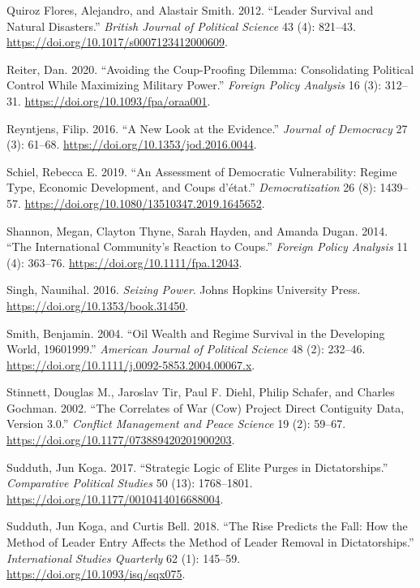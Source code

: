 \documentclass[
  12pt,
]{report}
\newlength{\cslhangindent}
\newenvironment{CSLReferences}[2] %
 {\begin{list}{}{%
  \setlength{\itemindent}{0pt}
  \setlength{\leftmargin}{0pt}
  \setlength{\parsep}{0pt}
  \ifodd #1
   \setlength{\leftmargin}{\cslhangindent}
   \setlength{\itemindent}{-1\cslhangindent}
  \fi
  \setlength{\itemsep}{#2\baselineskip}}}
 {\end{list}}
\begin{document}
\begin{CSLReferences}{1}{0}
Quiroz Flores, Alejandro, and Alastair Smith. 2012. {``Leader Survival
and Natural Disasters.''} \emph{British Journal of Political Science} 43
(4): 821--43. \url{https://doi.org/10.1017/s0007123412000609}.

Reiter, Dan. 2020. {``Avoiding the Coup-Proofing Dilemma: Consolidating
Political Control While Maximizing Military Power.''} \emph{Foreign
Policy Analysis} 16 (3): 312--31.
\url{https://doi.org/10.1093/fpa/oraa001}.

Reyntjens, Filip. 2016. {``A New Look at the Evidence.''} \emph{Journal
of Democracy} 27 (3): 61--68.
\url{https://doi.org/10.1353/jod.2016.0044}.

Schiel, Rebecca E. 2019. {``An Assessment of Democratic Vulnerability:
Regime Type, Economic Development, and Coups d{'}état.''}
\emph{Democratization} 26 (8): 1439--57.
\url{https://doi.org/10.1080/13510347.2019.1645652}.

Shannon, Megan, Clayton Thyne, Sarah Hayden, and Amanda Dugan. 2014.
{``The International Community's Reaction to Coups.''} \emph{Foreign
Policy Analysis} 11 (4): 363--76.
\url{https://doi.org/10.1111/fpa.12043}.

Singh, Naunihal. 2016. \emph{Seizing Power}. Johns Hopkins University
Press. \url{https://doi.org/10.1353/book.31450}.

Smith, Benjamin. 2004. {``Oil Wealth and Regime Survival in the
Developing World, 1960{\textendash}1999.''} \emph{American Journal of
Political Science} 48 (2): 232--46.
\url{https://doi.org/10.1111/j.0092-5853.2004.00067.x}.

Stinnett, Douglas M., Jaroslav Tir, Paul F. Diehl, Philip Schafer, and
Charles Gochman. 2002. {``The Correlates of War (Cow) Project Direct
Contiguity Data, Version 3.0.''} \emph{Conflict Management and Peace
Science} 19 (2): 59--67.
\url{https://doi.org/10.1177/073889420201900203}.

Sudduth, Jun Koga. 2017. {``Strategic Logic of Elite Purges in
Dictatorships.''} \emph{Comparative Political Studies} 50 (13):
1768--1801. \url{https://doi.org/10.1177/0010414016688004}.

Sudduth, Jun Koga, and Curtis Bell. 2018. {``The Rise Predicts the Fall:
How the Method of Leader Entry Affects the Method of Leader Removal in
Dictatorships.''} \emph{International Studies Quarterly} 62 (1):
145--59. \url{https://doi.org/10.1093/isq/sqx075}.


\end{CSLReferences}
\end{document}
